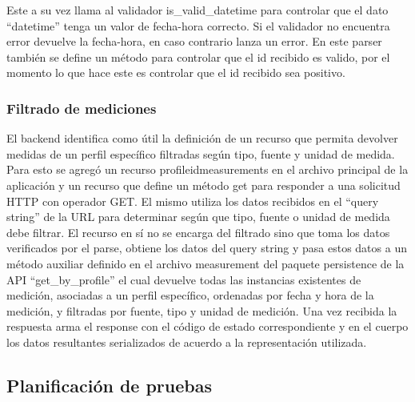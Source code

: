 Este a su vez llama al validador is\_valid\_datetime para controlar que el dato ``datetime'' tenga un valor de fecha-hora correcto. Si el validador no encuentra error devuelve la fecha-hora, en caso contrario lanza un error.
En este parser también se define un método para controlar que el id recibido es valido, por el momento lo que hace este es controlar que el id recibido sea positivo.
\begin{comment}
Se podría poner como cosas a mejorar la validación de id.
\end{comment}




\subsubsection{Filtrado de mediciones}
El backend identifica como útil la definición de un recurso que permita devolver medidas de un perfil específico filtradas según tipo, fuente y unidad de medida. Para esto se agregó un recurso \/profile\/id\/measurements en el archivo principal de la aplicación y un recurso que define un método get para responder a una solicitud HTTP con operador GET. El mismo utiliza los datos recibidos en el ``query string'' de la URL para determinar según que tipo, fuente o unidad de medida debe filtrar. El recurso en sí no se encarga del filtrado sino que toma los datos verificados por el parse, obtiene los datos del query string y pasa estos datos a un método auxiliar definido en el archivo measurement del paquete persistence de la API ``get\_by\_profile'' el cual devuelve todas las instancias existentes de medición, asociadas a un perfil específico, ordenadas por fecha y hora de la medición, y filtradas por fuente, tipo y unidad de medición. Una vez recibida la respuesta arma el response con el código de estado correspondiente y en el cuerpo los datos resultantes serializados de acuerdo a la representación utilizada.

\begin{comment}
Faltaría agregar algunas pruebas con curl y algo de código.
Poner que se desarrollo para pasar datos específicos para que el front-end presente datos resumidos cuando estos son muchos y complejos??
\end{comment}

\subsection{Planificación de pruebas}
